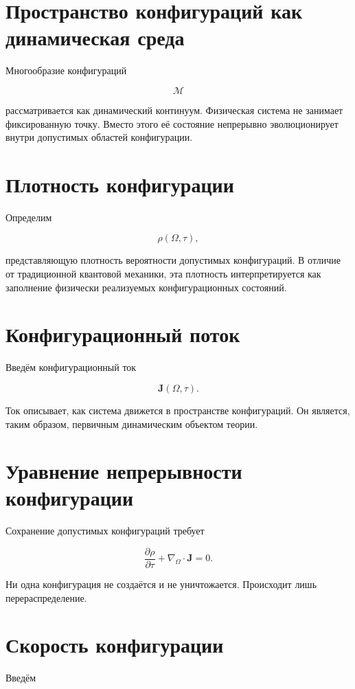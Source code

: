\section{Пространство конфигураций как динамическая среда}

Многообразие конфигураций

\[ \mathcal M \]

рассматривается как динамический континуум. Физическая система не занимает фиксированную точку. Вместо этого её состояние непрерывно эволюционирует внутри допустимых областей конфигурации.

\section{Плотность конфигурации}

Определим

\[ \rho(\Omega,\tau), \]

представляющую плотность вероятности допустимых конфигураций. В отличие от традиционной квантовой механики, эта плотность интерпретируется как заполнение физически реализуемых конфигурационных состояний.

\section{Конфигурационный поток}

Введём конфигурационный ток

\[ \boxed{ \mathbf J(\Omega,\tau). } \]

Ток описывает, как система движется в пространстве конфигураций. Он является, таким образом, первичным динамическим объектом теории.

\section{Уравнение непрерывности конфигурации}

Сохранение допустимых конфигураций требует

\[ \boxed{ \frac{\partial\rho}{\partial\tau} + \nabla_\Omega\cdot\mathbf J = 0. } \]

Ни одна конфигурация не создаётся и не уничтожается. Происходит лишь перераспределение.

\section{Скорость конфигурации}

Введём


